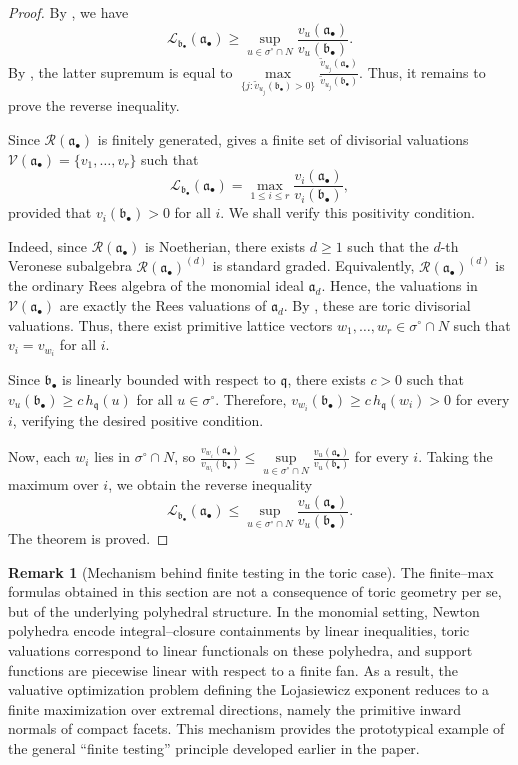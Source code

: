 \documentclass[12pt]{amsart}
\newcommand{\q}{\mathfrak q}
\renewcommand{\a}{\mathfrak{a}}
\renewcommand{\b}{\mathfrak{b}}
\newcommand{\R}{\mathcal{R}}
\newcommand{\Loj}{\mathcal{L}} %
\newcommand{\abul}{{\a_\bullet}}
\newcommand{\bbul}{{\b_\bullet}}
\theoremstyle{plain}
\theoremstyle{definition}
\newtheorem{remark}[theorem]{Remark}
\numberwithin{equation}{section}
\begin{document}
\begin{proof}
	By , we have
	$$
	\Loj_{\bbul}(\abul)\ge \sup\limits_{u\in\sigma^\circ\cap N}\frac{v_u(\abul)}{v_u(\bbul)}.
	$$
	By , the latter supremum is equal to
	$
	\max\limits_{\{j:\widetilde v_{u_j}(\bbul)>0\}}
	\frac{\widetilde v_{u_j}(\abul)}{\widetilde v_{u_j}(\bbul)}.
	$
	Thus, it remains to prove the reverse inequality.
	
	Since $\R(\abul)$ is finitely generated,  gives a finite set of divisorial valuations $\mathcal V(\abul)=\{v_1,\dots,v_r\}$ such that
	$$
	\Loj_{\bbul}(\abul)=\max_{1\le i\le r}\frac{v_i(\abul)}{v_i(\bbul)},
	$$
	provided that $v_i(\bbul)>0$ for all $i$. We shall verify this positivity condition. 
	
	Indeed, since $\R(\abul)$ is Noetherian, there exists $d\ge1$ such that the $d$-th Veronese subalgebra $\R(\abul)^{(d)}$ is standard graded. Equivalently, $\R(\abul)^{(d)}$ is the ordinary Rees algebra of the monomial ideal $\a_d$. Hence, the valuations in $\mathcal V(\abul)$ are exactly the Rees valuations of $\a_d$. By , these are toric divisorial valuations. Thus, there exist primitive lattice vectors $w_1,\dots,w_r\in\sigma^\circ\cap N$ such that $v_i=v_{w_i}$ for all $i$.
	
	Since $\bbul$ is linearly bounded with respect to $\q$, there exists $c>0$ such that $v_u(\bbul)\ge c\,h_\q(u)$ for all $u\in\sigma^\circ$. Therefore,
	$
	v_{w_i}(\bbul)\ge c\,h_\q(w_i)>0
	$
	for every $i$, verifying the desired positive condition. 
	

	Now, each $w_i$ lies in $\sigma^\circ\cap N$, so
	$
	\frac{v_{w_i}(\abul)}{v_{w_i}(\bbul)}
	\le
	\sup\limits_{u\in\sigma^\circ\cap N}\frac{v_u(\abul)}{v_u(\bbul)}
	$
	for every $i$. Taking the maximum over $i$, we obtain the reverse inequality
	$$
	\Loj_{\bbul}(\abul)
	\le
	\sup_{u\in\sigma^\circ\cap N}\frac{v_u(\abul)}{v_u(\bbul)}.
	$$
	The theorem is proved.
\end{proof}

\begin{remark}[Mechanism behind finite testing in the toric case]\label{rem:finite-candidates-filtrations}
	The finite--max formulas obtained in this section are not a consequence of toric geometry
	per se, but of the underlying polyhedral structure.
	In the monomial setting, Newton polyhedra encode integral--closure containments by linear
	inequalities, toric valuations correspond to linear functionals on these polyhedra, and
	support functions are piecewise linear with respect to a finite fan.
	As a result, the valuative optimization problem defining the Lojasiewicz exponent reduces
	to a finite maximization over extremal directions, namely the primitive inward normals of
	compact facets.
	This mechanism provides the prototypical example of the general ``finite testing'' principle
	developed earlier in the paper.
\end{remark}
\end{document}
